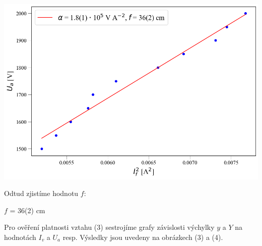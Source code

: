 \documentclass[a4paper,11pt]{article}
\begin{document}
\newpage
    \begin{minipage}[t]{0.5\textwidth} 
                \vspace{10pt}   
                \par \centering
                \includegraphics[scale=0.35]{ohn}
                \captionsetup{justification=centering, font=footnotesize}
                \label{fig:ohn}
                \vspace{10pt}
                \raggedright  

                \par Odtud zjistíme hodnotu $f$: 
                \begin{center}
                    $f$ = 36(2) cm
                \end{center}

                \par Pro ověření platnosti vztahu (3) sestrojíme grafy závislosti výchylky $y$ a $Y$ na hodnotách $I_v$ a $U_a$ resp. Výsledky jsou uvedeny na obrázkech (3) a (4).


\end{minipage}
\end{document}
